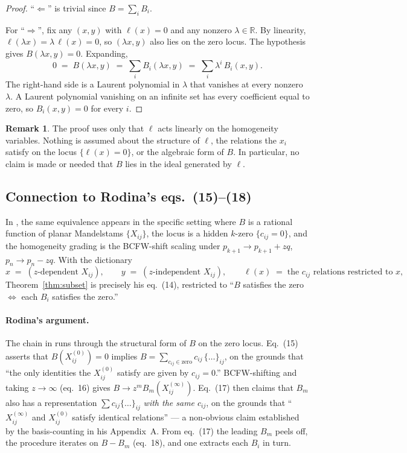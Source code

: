 \documentclass[11pt]{article}
\theoremstyle{definition}
\newtheorem*{remark}{Remark}
\newcommand{\R}{\mathbb{R}}
\begin{document}
\begin{proof}
``$\Leftarrow$'' is trivial since $B = \sum_i B_i$.

For ``$\Rightarrow$'', fix any $(x,y)$ with $\ell(x) = 0$ and any nonzero $\lambda \in \R$. By linearity, $\ell(\lambda x) = \lambda\,\ell(x) = 0$, so $(\lambda x, y)$ also lies on the zero locus. The hypothesis gives $B(\lambda x, y) = 0$. Expanding,
\[
0 \;=\; B(\lambda x, y) \;=\; \sum_{i} B_i(\lambda x, y) \;=\; \sum_{i} \lambda^{i}\, B_i(x, y).
\]
The right-hand side is a Laurent polynomial in $\lambda$ that vanishes at every nonzero $\lambda$. A Laurent polynomial vanishing on an infinite set has every coefficient equal to zero, so $B_i(x,y) = 0$ for every $i$. \qedhere
\end{proof}

\begin{remark}
The proof uses only that $\ell$ acts linearly on the homogeneity variables. Nothing is assumed about the structure of $\ell$, the relations the $x_i$ satisfy on the locus $\{\ell(x) = 0\}$, or the algebraic form of $B$. In particular, no claim is made or needed that $B$ lies in the ideal generated by $\ell$.
\end{remark}

\subsection{Connection to Rodina's eqs.~(15)--(18)}

In \cite[``Subset zeros and UV scaling'']{Rodina}, the same equivalence appears in the specific setting where $B$ is a rational function of planar Mandelstams $\{X_{ij}\}$, the locus is a hidden $k$-zero $\{c_{ij} = 0\}$, and the homogeneity grading is the BCFW-shift scaling under $p_{k+1} \to p_{k+1} + zq$, $p_n \to p_n - zq$. With the dictionary
\[
x \;=\; (\text{$z$-dependent } X_{ij}), \qquad y \;=\; (\text{$z$-independent } X_{ij}), \qquad \ell(x) \;=\; \text{the $c_{ij}$ relations restricted to $x$},
\]
Theorem~\ref{thm:subset} is precisely his eq.~(14), restricted to ``$B$ satisfies the zero $\Leftrightarrow$ each $B_i$ satisfies the zero.''

\paragraph{Rodina's argument.}
The chain in \cite[eqs.~(15)--(18)]{Rodina} runs through the structural form of $B$ on the zero locus. Eq.~(15) asserts that $B(X^{(0)}_{ij}) = 0$ implies $B = \sum_{c_{ij} \in \text{zero}} c_{ij}\,\{\dots\}_{ij}$, on the grounds that ``the only identities the $X^{(0)}_{ij}$ satisfy are given by $c_{ij}=0$.'' BCFW-shifting and taking $z \to \infty$ (eq.~16) gives $B \to z^m B_m(X^{(\infty)}_{ij})$. Eq.~(17) then claims that $B_m$ also has a representation $\sum c_{ij}\{\dots\}_{ij}$ \emph{with the same $c_{ij}$}, on the grounds that ``$X^{(\infty)}_{ij}$ and $X^{(0)}_{ij}$ satisfy identical relations'' --- a non-obvious claim established by the basis-counting in his Appendix~A. From eq.~(17) the leading $B_m$ peels off, the procedure iterates on $B - B_m$ (eq.~18), and one extracts each $B_i$ in turn.
\end{document}
